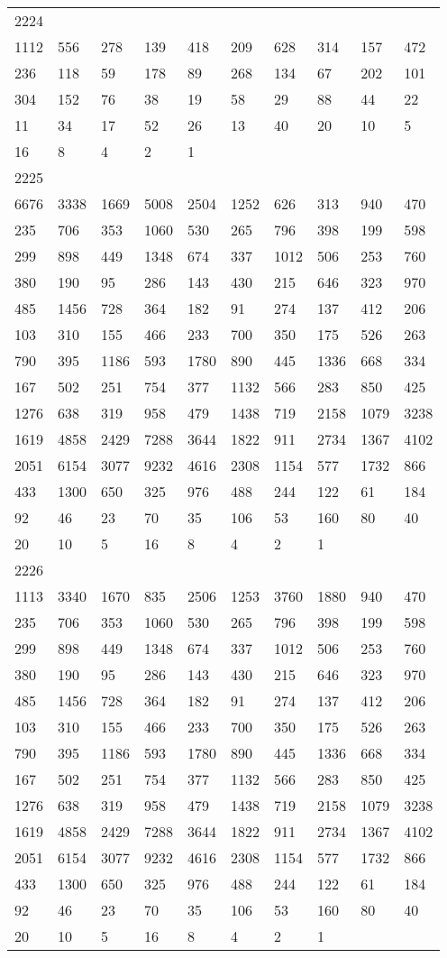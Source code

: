 \begin{longtable}{*{10}{l}}
2224&&&&&&&&&\\
1112& 556& 278& 139& 418& 209& 628& 314& 157& 472\\
236& 118& 59& 178& 89& 268& 134& 67& 202& 101\\
304& 152& 76& 38& 19& 58& 29& 88& 44& 22\\
11& 34& 17& 52& 26& 13& 40& 20& 10& 5\\
16& 8& 4& 2& 1& \\

2225&&&&&&&&&\\
6676& 3338& 1669& 5008& 2504& 1252& 626& 313& 940& 470\\
235& 706& 353& 1060& 530& 265& 796& 398& 199& 598\\
299& 898& 449& 1348& 674& 337& 1012& 506& 253& 760\\
380& 190& 95& 286& 143& 430& 215& 646& 323& 970\\
485& 1456& 728& 364& 182& 91& 274& 137& 412& 206\\
103& 310& 155& 466& 233& 700& 350& 175& 526& 263\\
790& 395& 1186& 593& 1780& 890& 445& 1336& 668& 334\\
167& 502& 251& 754& 377& 1132& 566& 283& 850& 425\\
1276& 638& 319& 958& 479& 1438& 719& 2158& 1079& 3238\\
1619& 4858& 2429& 7288& 3644& 1822& 911& 2734& 1367& 4102\\
2051& 6154& 3077& 9232& 4616& 2308& 1154& 577& 1732& 866\\
433& 1300& 650& 325& 976& 488& 244& 122& 61& 184\\
92& 46& 23& 70& 35& 106& 53& 160& 80& 40\\
20& 10& 5& 16& 8& 4& 2& 1& \\

2226&&&&&&&&&\\
1113& 3340& 1670& 835& 2506& 1253& 3760& 1880& 940& 470\\
235& 706& 353& 1060& 530& 265& 796& 398& 199& 598\\
299& 898& 449& 1348& 674& 337& 1012& 506& 253& 760\\
380& 190& 95& 286& 143& 430& 215& 646& 323& 970\\
485& 1456& 728& 364& 182& 91& 274& 137& 412& 206\\
103& 310& 155& 466& 233& 700& 350& 175& 526& 263\\
790& 395& 1186& 593& 1780& 890& 445& 1336& 668& 334\\
167& 502& 251& 754& 377& 1132& 566& 283& 850& 425\\
1276& 638& 319& 958& 479& 1438& 719& 2158& 1079& 3238\\
1619& 4858& 2429& 7288& 3644& 1822& 911& 2734& 1367& 4102\\
2051& 6154& 3077& 9232& 4616& 2308& 1154& 577& 1732& 866\\
433& 1300& 650& 325& 976& 488& 244& 122& 61& 184\\
92& 46& 23& 70& 35& 106& 53& 160& 80& 40\\
20& 10& 5& 16& 8& 4& 2& 1& \\


\end{longtable}
